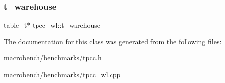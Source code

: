 \mbox{\label{classtpcc__wl_a7f1b94e2593ed24fca5a17f333b791d2}} 
\subsubsection{\texorpdfstring{t\+\_\+warehouse}{t\_warehouse}}
{\footnotesize\ttfamily \hyperlink{classtable__t}{table\+\_\+t}$\ast$ tpcc\+\_\+wl\+::t\+\_\+warehouse}



The documentation for this class was generated from the following files\+:\begin{DoxyCompactItemize}
\item 
macrobench/benchmarks/\hyperlink{tpcc_8h}{tpcc.\+h}\item 
macrobench/benchmarks/\hyperlink{tpcc__wl_8cpp}{tpcc\+\_\+wl.\+cpp}\end{DoxyCompactItemize}
